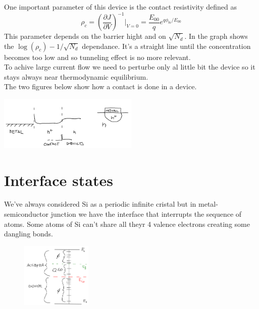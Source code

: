 One important parameter of this device is the contact resistivity defined as 
\begin{equation}
\rho_c=(\frac{\partial J }{\partial V})^{-1}|_{V=0}=\frac{E_{00}}{q}e^{q\phi_{bi}/E_{00}}
\end{equation}
This parameter depends on the barrier hight and on $\sqrt{N_d}$. In the graph shows the $\log (\rho_c) - 1/\sqrt{N_d}$ dependance. It's a straight line until the concentration becomes too low and so tunneling effect is no more relevant.\\
To achive large current flow we need to perturbe only al little bit the device so it stays always near thermodynamic equilibrium.\\
The two figures below show how a contact is done in a device.

\centering
\includegraphics[width=0.5\textwidth]{ohmicconctact.png}\\
\raggedright

\section{Interface states}
We've always considered Si as a periodic infinite cristal but in metal-semiconductor junction we have the interface that interrupts the sequence of atoms. Some atoms of Si can't share all theyr 4 valence electrons creating some dangling bonds.\\

\begin{figure}
\includegraphics[width=0.3\textwidth]{is01.png}
\end{figure}

